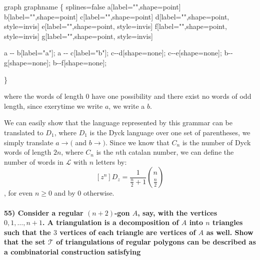 \documentclass[
]{article}
\newenvironment{Shaded}{}{}
\newcommand{\NormalTok}[1]{#1}
\begin{document}
\begin{Shaded}
\begin{Highlighting}[]
\NormalTok{graph graphname \{ }
\NormalTok{splines=false}
\NormalTok{a[label="",shape=point]}
\NormalTok{b[label="",shape=point]}
\NormalTok{c[label="",shape=point]}
\NormalTok{d[label="",shape=point, style=invis]}
\NormalTok{e[label="",shape=point, style=invis]}
\NormalTok{f[label="",shape=point, style=invis]}
\NormalTok{g[label="",shape=point, style=invis]}

\NormalTok{        a {-}{-} b[label="a"]; }
\NormalTok{        a {-}{-} c[label="b"];}
\NormalTok{        c{-}{-}d[shape=none];}
\NormalTok{        c{-}{-}e[shape=none];}
\NormalTok{        b{-}{-}g[shape=none];}
\NormalTok{        b{-}{-}f[shape=none];}

\NormalTok{\} }
\end{Highlighting}
\end{Shaded}

where the words of length \(0\) have one possibility and there exist no
words of odd length, since exerytime we write \(a\), we write a \(b\).

We can easily show that the language represented by this grammar can be
translated to \(D_1\), where \(D_1\) is the Dyck language over one set
of parentheses, we simply translate \(a \rightarrow (\) and
\(b \rightarrow )\). Since we know that \(C_n\) is the number of Dyck
words of length \(2n\), where \(C_n\) is the \(n\)th catalan number, we
can define the number of words in \(\mathcal{L}\) with \(n\) letters by:
\[
[z^{n}] D_z = \frac{1}{\frac{n}{2} +1} \binom{n}{\frac{n}{2}}
\], for even \(n \geq0\) and by \(0\) otherwise.

\hypertarget{consider-a-regular-n2-gon-a-say-with-the-vertices-01-dots-n1.-a-triangulation-is-a-decomposition-of-a-into-n-triangles-such-that-the-3-vertices-of-each-triangle-are-vertices-of-a-as-well.-show-that-the-set-mathcalt-of-triangulations-of-regular-polygons-can-be-described-as-a-combinatorial-construction-satisfying}{%
\paragraph{\texorpdfstring{55) Consider a regular \((n+2)\)-gon \(A\),
say, with the vertices \(0,1, \dots, n+1\). A triangulation is a
decomposition of \(A\) into \(n\) triangles such that the \(3\) vertices
of each triangle are vertices of \(A\) as well. Show that the set
\(\mathcal{T}\) of triangulations of regular polygons can be described
as a combinatorial construction
satisfying}{55) Consider a regular (n+2)-gon A, say, with the vertices 0,1, \textbackslash dots, n+1. A triangulation is a decomposition of A into n triangles such that the 3 vertices of each triangle are vertices of A as well. Show that the set \textbackslash mathcal\{T\} of triangulations of regular polygons can be described as a combinatorial construction satisfying}}\label{consider-a-regular-n2-gon-a-say-with-the-vertices-01-dots-n1.-a-triangulation-is-a-decomposition-of-a-into-n-triangles-such-that-the-3-vertices-of-each-triangle-are-vertices-of-a-as-well.-show-that-the-set-mathcalt-of-triangulations-of-regular-polygons-can-be-described-as-a-combinatorial-construction-satisfying}}
\end{document}
